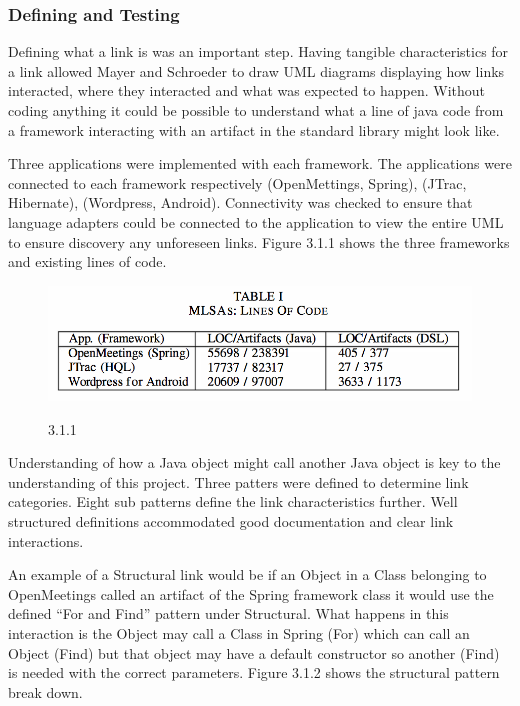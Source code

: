 \documentclass{article}
\begin{document}
		\subsubsection{Defining and Testing}
		Defining what a link is was an important step. Having tangible characteristics for a link allowed Mayer and Schroeder to draw UML diagrams displaying how links interacted, where they interacted and what was expected to happen. Without coding anything it could be possible to understand what a line of java code from a framework interacting with an artifact in the standard library might look like.

		Three applications were implemented with each framework. The applications were connected to each framework respectively {(OpenMettings, Spring), (JTrac, Hibernate), (Wordpress, Android)}. Connectivity was checked to ensure that language adapters could be connected to the application to view the entire UML to ensure discovery any unforeseen links. Figure 3.1.1 shows the three frameworks and existing lines of code.

			\begin{figure}[!htb]
				\includegraphics[width=.8\textwidth]{img1.png}
				\begin{center}
					\figurename{ 3.1.1}
				\end{center}
			\end{figure}

		Understanding of how a Java object might call another Java object is key to the understanding of this project. Three patters were defined to determine link categories. Eight sub patterns define the link characteristics further. Well structured definitions accommodated good documentation and clear link interactions. 
		
		An example of a Structural link would be if an Object in a Class belonging to OpenMeetings called an artifact of the Spring framework class it would use the defined “For and Find” pattern under Structural. What happens in this interaction is the Object may call a Class in Spring (For) which can call an Object (Find) but that object may have a default constructor so another (Find) is needed with the correct parameters. Figure 3.1.2 shows the structural pattern break down.
		
\end{document}
